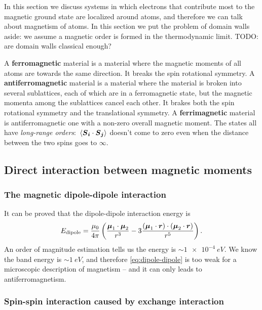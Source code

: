 \documentclass[hyperref, a4paper]{article}
\newcommand*{\concept}[1]{{\textbf{#1}}}
\begin{document}
In this section we discuss systems in which 
electrons that contribute most to the magnetic ground state 
are localized around atoms,
and therefore we can talk about magnetism of atoms.
In this section we put the problem of domain walls aside: 
we assume a magnetic order is formed in the thermodynamic limit. TODO: are domain walls classical enough?

A \concept{ferromagnetic} material is a material 
where the magnetic moments of all atoms are towards the same direction.
It breaks the spin rotational symmetry.
A \concept{antiferromagnetic} material is a material
where the material is broken into several sublattices,
each of which are in a ferromagnetic state,
but the magnetic momenta among the sublattices cancel each other.
It brakes both the spin rotational symmetry 
and the translational symmetry.
A \concept{ferrimagnetic} material is antiferromagnetic one with a non-zero overall magnetic moment.
The states all have \emph{long-range orders}:
$\expval*{\vb*{S}_{\vb*{i}} \cdot \vb*{S}_{\vb*{j}}}$ doesn't come to zero 
even when the distance between the two spins goes to $\infty$.

\subsection{Direct interaction between magnetic moments}

\subsubsection{The magnetic dipole-dipole interaction}\label{sec:localized.heisenberg.dipole}

It can be proved that the dipole-dipole interaction energy is 
\begin{equation}
    E_{\text{dipole}} = 
    \frac{\mu_0}{4\pi}
    \left(
        \frac{\vb*{\mu}_1 \cdot \vb*{\mu}_2}{r^3}
        - 3 \frac{(\vb*{\mu}_1 \cdot \vb*{r}) \cdot (\vb*{\mu}_2 \cdot \vb*{r})}{r^5}
    \right).
    \label{eq:dipole-dipole}
\end{equation}
An order of magnitude estimation tells us the energy is $\sim \SI{1e-4}{eV}$.
We know the band energy is $\sim \SI{1}{eV}$,
and therefore \eqref{eq:dipole-dipole} is too weak
for a microscopic description of magnetism -- 
and it can only leads to antiferromagnetism.

\subsubsection{Spin-spin interaction caused by exchange interaction}
\end{document}

